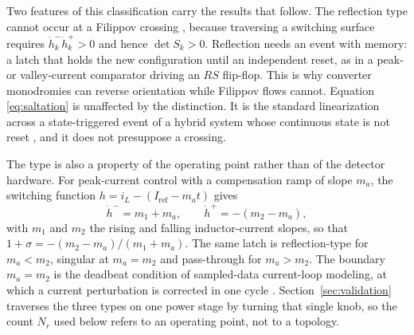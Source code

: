 \documentclass[journal]{IEEEtran}
\begin{document}
Two features of this classification carry the results that follow. The
reflection type cannot occur at a Filippov crossing \cite{filippov1988},
because traversing a switching surface requires $\dot h_k^{-}\dot h_k^{+}>0$
and hence $\det S_k>0$. Reflection needs an event with memory: a latch that
holds the new configuration until an independent reset, as in a peak- or
valley-current comparator driving an $RS$ flip-flop. This is why converter
monodromies can reverse orientation while Filippov flows cannot. Equation
\eqref{eq:saltation} is unaffected by the distinction. It is the standard
linearization across a state-triggered event of a hybrid system whose
continuous state is not reset
\cite{aizerman1958,muller1995,leine2004,kong2024saltation}, and it does not
presuppose a crossing.

The type is also a property of the operating point rather than of the
detector hardware. For peak-current control with a compensation ramp of slope
$m_a$, the switching function $h=i_L-(I_{\mathrm{ref}}-m_at)$ gives
\begin{equation}
\dot h^{-}=m_1+m_a,\qquad \dot h^{+}=-(m_2-m_a),
\label{eq:pico}
\end{equation}
with $m_1$ and $m_2$ the rising and falling inductor-current slopes, so that
$1+\sigma=-(m_2-m_a)/(m_1+m_a)$. The same latch is reflection-type for
$m_a<m_2$, singular at $m_a=m_2$ and pass-through for $m_a>m_2$. The boundary
$m_a=m_2$ is the deadbeat condition of sampled-data current-loop modeling, at
which a current perturbation is corrected in one cycle
\cite{ridley1991new,erickson2020fundamentals}. Section~\ref{sec:validation}
traverses the three types on one power stage by turning that single knob,
so the count $N_r$ used below refers to an operating point, not to a
topology.
\end{document}
